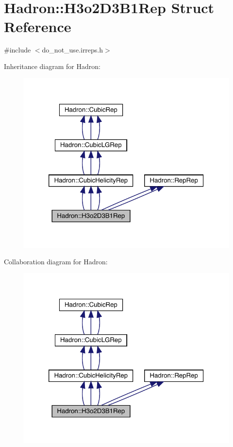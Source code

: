 \hypertarget{structHadron_1_1H3o2D3B1Rep}{}\section{Hadron\+:\+:H3o2\+D3\+B1\+Rep Struct Reference}
\label{structHadron_1_1H3o2D3B1Rep}


{\ttfamily \#include $<$do\+\_\+not\+\_\+use.\+irreps.\+h$>$}



Inheritance diagram for Hadron\+:
\nopagebreak
\begin{figure}[H]
\begin{center}
\leavevmode
\includegraphics[width=320pt]{d0/df9/structHadron_1_1H3o2D3B1Rep__inherit__graph}
\end{center}
\end{figure}


Collaboration diagram for Hadron\+:
\nopagebreak
\begin{figure}[H]
\begin{center}
\leavevmode
\includegraphics[width=320pt]{d2/d05/structHadron_1_1H3o2D3B1Rep__coll__graph}
\end{center}
\end{figure}
